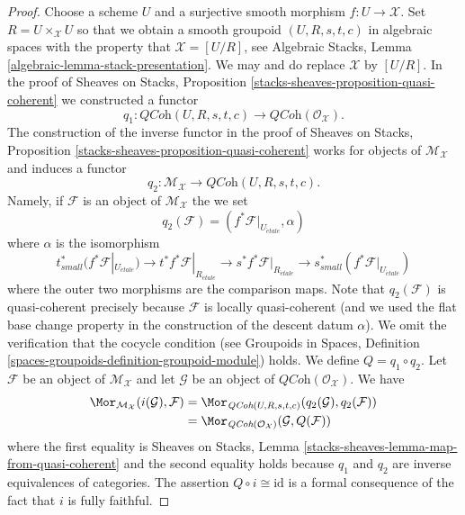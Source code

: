 \begin{proof}
Choose a scheme $U$ and a surjective smooth morphism $f : U \to \mathcal{X}$.
Set $R = U \times_\mathcal{X} U$ so that we obtain a smooth groupoid
$(U, R, s, t, c)$ in algebraic spaces with the property that
$\mathcal{X} = [U/R]$, see
Algebraic Stacks, Lemma \ref{algebraic-lemma-stack-presentation}.
We may and do replace $\mathcal{X}$ by $[U/R]$.
In the proof of
Sheaves on Stacks, Proposition \ref{stacks-sheaves-proposition-quasi-coherent}
we constructed a functor
$$
q_1 :
\textit{QCoh}(U, R, s, t, c)
\longrightarrow
\textit{QCoh}(\mathcal{O}_\mathcal{X}).
$$
The construction of the inverse functor in the proof of
Sheaves on Stacks, Proposition \ref{stacks-sheaves-proposition-quasi-coherent}
works for objects of $\mathcal{M}_\mathcal{X}$ and induces a functor
$$
q_2 :
\mathcal{M}_\mathcal{X}
\longrightarrow
\textit{QCoh}(U, R, s, t, c).
$$
Namely, if $\mathcal{F}$ is an object of $\mathcal{M}_\mathcal{X}$
the we set
$$
q_2(\mathcal{F}) = (f^*\mathcal{F}|_{U_{\acute{e}tale}}, \alpha)
$$
where $\alpha$ is the isomorphism
$$
t_{small}^*(f^*\mathcal{F}|_{U_{\acute{e}tale}})
\to
t^*f^*\mathcal{F}|_{R_{\acute{e}tale}} \to
s^*f^*\mathcal{F}|_{R_{\acute{e}tale}} \to
s_{small}^*(f^*\mathcal{F}|_{U_{\acute{e}tale}})
$$
where the outer two morphisms are the comparison maps. Note that
$q_2(\mathcal{F})$ is quasi-coherent precisely because $\mathcal{F}$ is
locally quasi-coherent (and we used the flat base change property
in the construction of the descent datum $\alpha$). We omit the
verification that the cocycle condition (see
Groupoids in Spaces, Definition
\ref{spaces-groupoids-definition-groupoid-module})
holds. We define $Q = q_1 \circ q_2$.
Let $\mathcal{F}$ be an object of $\mathcal{M}_\mathcal{X}$ and
let $\mathcal{G}$ be an object of $\textit{QCoh}(\mathcal{O}_\mathcal{X})$.
We have
\begin{align*}
\Mor_{\mathcal{M}_\mathcal{X}}(i(\mathcal{G}), \mathcal{F})
& =
\Mor_{\textit{QCoh}(U, R, s, t, c)}(q_2(\mathcal{G}), q_2(\mathcal{F})) \\
& =
\Mor_{\textit{QCoh}(\mathcal{O}_\mathcal{X})}(\mathcal{G}, Q(\mathcal{F}))
\end{align*}
where the first equality is
Sheaves on Stacks, Lemma \ref{stacks-sheaves-lemma-map-from-quasi-coherent}
and the second equality holds because $q_1$ and $q_2$ are inverse
equivalences of categories. The assertion $Q \circ i \cong \text{id}$
is a formal consequence of the fact that $i$ is fully faithful.
\end{proof}

